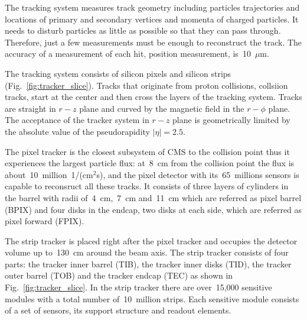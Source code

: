 The tracking system measures track geometry including particles trajectories and locations of primary and secondary vertices and momenta of charged particles. It needs to disturb particles as little as possible so that they can pass through. Therefore, just a few measurements must be enough to reconstruct the track. The accuracy of a measurement of each hit, position measurement, is~10~$\mu$m.

The tracking system consists of silicon pixels and silicon strips (Fig.~\ref{fig:tracker_slice}). Tracks that originate from proton collisions, collsiion tracks, start at the center and then cross the layers of the tracking system. Tracks are straight in $r-z$ plane and curved by the magnetic field in the $r-\phi$ plane. The acceptance of the tracker system in $r-z$ plane is geometrically limited by the absolute value of the pseudorapidity $|\eta|=2.5$.

The pixel tracker is the closest subsystem of CMS to the collision point thus it experiences the largest particle flux: at~8~cm from the collision point the flux is about~10~million~1/(cm$^2$s), and the pixel detector with its~65~millions sensors is capable to reconsruct all these tracks. It consists of three layers of cylinders in the barrel with radii of~4~cm,~7~cm and~11~cm which are referred as pixel barrel (BPIX) and four disks in the endcap, two disks at each side, which are referred as pixel forward (FPIX). 


The strip tracker is placed right after the pixel tracker and occupies the detector volume up to~130~cm around the beam axis. The strip tracker consists of four parts: the tracker inner barrel (TIB), the tracker inner disks (TID), the tracker outer barrel (TOB) and the tracker endcap (TEC) as shown in Fig.~\ref{fig:tracker_slice}. In the strip tracker there are over~15,000 sensitive modules with a total number of~10~million strips. Each sensitive module consists of a set of sensors, its support structure and readout elements.



